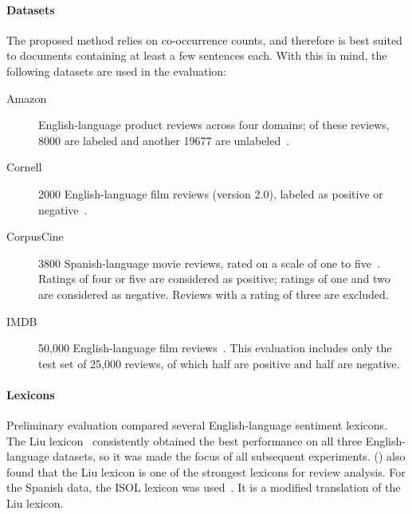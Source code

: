 \paragraph{Datasets} The proposed method relies on co-occurrence counts, and therefore is best suited to documents containing at least a few sentences each. With this in mind, the following datasets are used in the evaluation:
\begin{description}
\item[Amazon] English-language product reviews across four domains; of these reviews, 8000 are labeled and another 19677 are unlabeled~\cite{blitzer2007biographies}.
\item[Cornell] 2000 English-language film reviews (version 2.0), labeled as positive or negative~\cite{pang2004sentimental}.
\item[CorpusCine] 3800 Spanish-language movie reviews, rated on a scale of one to five~\cite{vilares2015syntactic}. Ratings of four or five are considered as positive; ratings of one and two are considered as negative. Reviews with a rating of three are excluded.\item[IMDB] 50,000 English-language film reviews~\cite{maas2011learning}. This evaluation includes only the test set of 25,000 reviews, of which half are positive and half are negative.
\end{description}

\paragraph{Lexicons} Preliminary evaluation compared several English-language sentiment lexicons. The Liu lexicon~\cite{liu2015sentiment} %
consistently obtained the best performance on all three English-language datasets, so it was made the focus of all subsequent experiments. \citeauthor{ribeiro2016sentibench} (\citeyear{ribeiro2016sentibench}) also found that the Liu lexicon is one of the strongest lexicons for review analysis.
For the Spanish data, the ISOL lexicon was used~\cite{molina2013semantic}. It is a modified translation of the Liu lexicon.

\newcommand{\sysmult}{\sys{ProbLex-Mult}}
\newcommand{\sysdcm}{\sys{ProbLex-DCM}}

